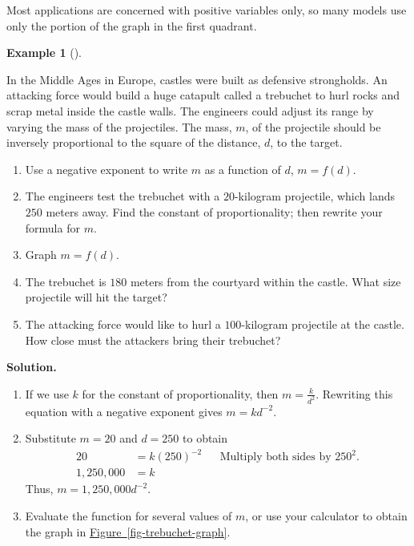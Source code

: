 \documentclass[10pt,]{book}
\theoremstyle{plain}
\theoremstyle{definition}
\theoremstyle{definition}
\theoremstyle{definition}
\newtheorem{example}[theorem]{Example}
\theoremstyle{definition}
\theoremstyle{definition}
\numberwithin{equation}{section}
\newcommand{\amp}{ & }
\begin{document}
    Most applications are concerned with positive variables only, so many models use only the portion of the graph in the first quadrant.
%
\begin{example}[]\label{example-trebuchet}

    In the Middle Ages in Europe, castles were built as defensive strongholds. An attacking force would build a huge catapult called a trebuchet to hurl rocks and scrap metal inside the castle walls. The engineers could adjust its range by varying the mass of the projectiles. The mass, \(m\), of the projectile should be inversely proportional to the square of the distance, \(d\), to the target.

\leavevmode%
\begin{enumerate}[label=*\alph**]
\item\hypertarget{li-437}{}Use a negative exponent to write \(m\) as a function of \(d\), \(m = f (d)\).\item\hypertarget{li-438}{}The engineers test the trebuchet with a \(20\)-kilogram projectile, which lands \(250\) meters away. Find the constant of proportionality; then rewrite your formula for \(m\).\item\hypertarget{li-439}{}Graph \(m = f (d)\).\item\hypertarget{li-440}{}The trebuchet is \(180\) meters from the courtyard within the castle. What size projectile will hit the target?\item\hypertarget{li-441}{}The attacking force would like to hurl a \(100\)-kilogram projectile at the castle. How close must the attackers bring their trebuchet?\end{enumerate}
%
\par\medskip\noindent%
\textbf{Solution.}\quad 
\leavevmode%
\begin{enumerate}[label=*\alph**]
\item\hypertarget{li-442}{}If we use \(k\) for the constant of proportionality, then \(m = \frac{k}{d^2}\). Rewriting this equation with a negative exponent gives \(m = kd^{−2}\).\item\hypertarget{li-443}{}Substitute \(m = 20\) and \(d = 250\) to obtain
    \begin{align*}
    20 \amp = k(250)^{−2}\amp\amp \text{Multiply both sides by }250^2.\\
    1,250,000 \amp = k
    \end{align*}
    Thus, \(m = 1,250,000 d^{−2}\).\item\hypertarget{li-444}{}Evaluate the function for several values of \(m\), or use your calculator to obtain the graph in \hyperref[fig-trebuchet-graph]{Figure~\ref{fig-trebuchet-graph}}.

\end{enumerate}
\end{example}
\end{document}

